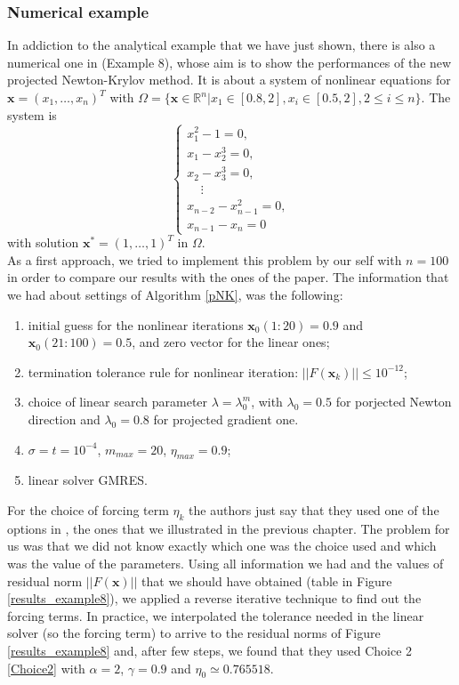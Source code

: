 \subsubsection{Numerical example}
In addiction to the analytical example that we have just shown, there is also a numerical one in \cite{MAIN} (Example 8), whose aim is to show the performances of the new projected Newton-Krylov method. It is about a system of nonlinear equations for $ \textbf{x} = (x_1, \dots, x_n)^T $ with $ \Omega = \{ \textbf{x} \in \mathbb{R}^n | x_1 \in [0.8, 2], x_i \in [0.5, 2], 2 \leq i \leq n \} $. The system is
\begin{equation*}
\begin{cases}
x_1^2 - 1 = 0,\\
x_1 - x_2^3 = 0,\\
x_2 - x_3^3 = 0, \\
\; \;  \; \; \vdots \\
x_{n-2} - x_{n-1}^2 = 0,\\ 
x_{n-1} - x_n = 0
\end{cases}
\end{equation*}
with solution  $ \textbf{x}^* = (1, \dots, 1)^T $ in $ \Omega $.\\ 
As a first approach, we tried to implement this problem by our self with $ n = 100 $ in order to compare our results with the ones of the paper. The information that we had about settings of Algorithm \ref{pNK}, was the following: 
\begin{enumerate}[label=(\alph*)]
	\item initial guess for the nonlinear iterations $ \textbf{x}_0 (1:20) = 0.9  $ and $ \textbf{x}_0 (21:100) = 0.5$, and zero vector for the linear ones;
	\item termination tolerance rule for nonlinear iteration: $ ||F(\textbf{x}_k)|| \leq 10^{-12} $;
	\item choice of linear search parameter $ \lambda = \lambda_0^ m$, with $ \lambda_0 = 0.5 $ for porjected Newton direction and $ \lambda_0 = 0.8 $ for projected gradient one.
	\item $ \sigma = t = 10^{-4} $, $ m_{max} = 20 $, $ \eta_{max} = 0.9 $;
	\item linear solver GMRES.
\end{enumerate}
For the choice of forcing term $ \eta_k $ the authors just say that they used one of the options in \cite{Forcingterm}, the ones that we illustrated in the previous chapter. The problem for us was that we did not know exactly which one was the choice used and which was the value of the parameters. Using all information we had and the values of residual norm $ ||F(\textbf{x})|| $ that we should have obtained (table in Figure \ref{results_example8}), we applied a reverse iterative technique to find out the forcing terms. In practice, we interpolated the tolerance needed in the linear solver (so the forcing term) to arrive to the residual norms of Figure \ref{results_example8} and, after few steps, we found that they used Choice 2 \eqref{Choice2} with $ \alpha = 2 $, $ \gamma = 0.9 $ and $ \eta_0 \simeq 0.765518 $.\\
